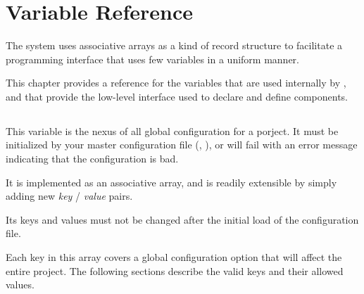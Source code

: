%
%
%
%
\chapter{Variable Reference}\label{chap:variables}

The \lmsbw system uses associative arrays as a kind of record
structure to facilitate a programming interface that uses few
variables in a uniform manner.

This chapter provides a reference for the variables that are used
internally by \lmsbw, and that provide the low-level interface used to
declare and define components.

\section{\lmsbwconfiguration}\label{variables:lmsbw-configuration}

This variable is the nexus of all global configuration for a porject.
It must be initialized by your master configuration file
(, ), or
\lmsbw will fail with an error message indicating that the
configuration is bad.

It is implemented as an associative array, and is readily extensible
by simply adding new \emph{key} / \emph{value} pairs.

Its keys and values must not be changed after the initial load of the
configuration file.

Each key in this array covers a global configuration option that will
affect the entire project.  The following sections describe the valid
keys and their allowed values.


\begin{center}\end{center}


